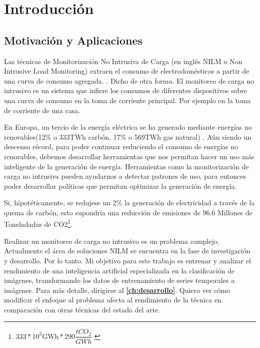 
\chapter{Introducción}
\label{ch:intro}

\section{Motivación y Aplicaciones}
\label{sec:motivacionyaplicaciones}

Las técnicas de Monitorización No Intrusiva de Carga (en inglés NILM o Non Intrusive Load Monitoring) extraen el consumo de electrodomésticos a partir de una curva de consumo agregada. \autocite[1]{NILMreview2017}. Dicho de otra forma. El monitoreo de carga no intrusivo es un sistema que infiere los consumos de diferentes dispositivos sobre una curva de consumo en la toma de corriente principal. Por ejemplo en la toma de corriente de una casa.

En Europa, un tercio de la energía eléctrica se ha generado mediante energías no renovables(12\% o 333TWh carbón, 17\% o 569TWh gas natural)\autocite{energyeurope} \autocite{ember2024european}. Aún siendo un descenso récord, para poder continuar reduciendo el consumo de energías no renovables, debemos desarrollar herramientas que nos permitan hacer un uso más inteligente de la generación de energía. Herramientas como la monitorización de carga no intrusiva pueden ayudarnos a detectar patrones de uso\autocite[11]{nilmstateoftheart}, para entonces poder desarrollar políticas que permitan optimizar la generación de energía. 

Si, hipotéticamente, se redujese un 2\% la generación de electricidad a través de la quema de carbón, esto supondría una reducción de emisiones de 96.6 Millones de Toneladadas de CO2\footnote{$333*10^3\text{GWh}*290\dfrac{tCO_{2}}{GWh}$ \autocite{postcarbonelectricidad}}.

Realizar un monitoreo de carga no intrusivo es un problema complejo. Actualmente el área de soluciones NILM se encuentra en la fase de investigación y desarrollo. Por lo tanto. Mi objetivo para este trabajo es entrenar y analizar el rendimiento de una inteligencia artificial especializada en la clasificación de imágenes, transformando los datos de entrenamiento de series temporales a imágenes. Para más detalle, dirigirse al \textbf{\autoref{ch:desarrollo}}. Quiero ver cómo modificar el enfoque al problema afecta al rendimiento de la técnica en comparación con otras técnicas del estado del arte. 

